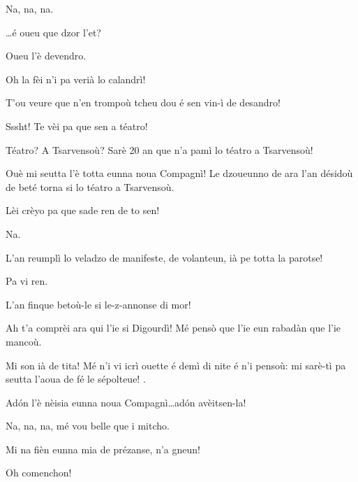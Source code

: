 \begin{drama}
\Vetchotspeaks Na, na, na.

\Spectateurspeaks \ldots é oueu que dzor l'et?

\TsachaouIIspeaks Oueu l’è devendro.

\Vetchotspeaks Oh la fèi n'i pa verià lo calandrì!

\TsachaouIIspeaks T’ou veure que n'en trompoù tcheu dou é sen vin-ì de desandro!

\Mammaspeaks{} Sssht! Te vèi pa que sen a téatro!

\TsachaouIIspeaks Téatro? A Tsarvensoù? Sarè 20 an que n'a pamì lo téatro a Tsarvensoù!

\Mammaspeaks Ouè mi seutta l'è totta eunna noua Compagnì! Le dzoueunno de ara l'an désidoù de beté torna si lo téatro a Tsarvensoù.


\Mammaspeaks Lèi crèyo pa que sade ren de to sen!

\TsachaouIspeaks Na.

\Mammaspeaks L'an reumplì lo veladzo de manifeste, de volanteun, ià pe totta la parotse!

\TsachaouIspeaks Pa vi ren.

\Mammaspeaks L'an finque betoù-le si le-z-annonse di mor!

\TsachaouIspeaks{} Ah t'a comprèi ara qui l'ie si Digourdì! Mé pensò que l'ie eun rabadàn que l'ie mancoù.

\TsachaouIIspeaks Mi son ià de tita! Mé n'i vi icrì ouette é demì di nite é n'i pensoù: \og mi sarè-tì pa seutta l'aoua de fé le sépolteue! \fg .

\TsachaouIspeaks Ad\'on l'è nèisia eunna noua Compagnì\ldots ad\'on avèitsen-la!

\Vetchotspeaks Na, na, na, mé vou belle que i mitcho.

\TsachaouIspeaks{} Mi na fièn eunna mia de prézanse, n'a gneun!


\Mammaspeaks Oh comenchon!




\end{drama}
